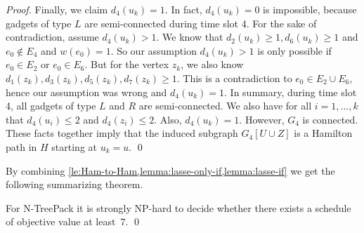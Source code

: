\documentclass[runningheads]{llncs}
\newcommand{\xxxNTP}{{\sc N-TreePack}}
\begin{document}
\begin{proof}
Finally, we claim $d_4(u_k) = 1$. In fact, $d_4(u_k) = 0$ is impossible, because gadgets of type $L$ are semi-connected during time slot 4. For the sake of contradiction, assume $d_4(u_k) > 1$. We know that $d_2(u_k) \geq 1, d_6(u_k) \geq 1$ and $e_0 \not\in E_4$ and $w(e_0) = 1$. So our assumption $d_4(u_k) > 1$ is only possible if $e_0 \in E_2$ or $e_0 \in E_6$. But for the vertex $z_k$, we also know $d_1(z_k), d_3(z_k), d_5(z_k), d_7(z_k) \geq 1$. This is a contradiction to $e_0 \in E_2 \cup E_6$, hence our assumption was wrong and $d_4(u_k) = 1$.
In summary, during time slot 4, all gadgets of type $L$ and $R$ are semi-connected. We also have for all $i=1,\dots,k$ that $d_4(u_i) \leq 2$ and $d_4(z_i) \leq 2$. Also, $d_4(u_k) = 1$. However, $G_4$ is connected. These facts together imply that the induced subgraph $G_4[U \cup Z]$ is a Hamilton path in $H$ starting at $u_k = u$.
\qed
\end{proof}

By combining \cref{le:Ham-to-Ham,lemma:lasse-only-if,lemma:lasse-if} we get
the following summarizing theorem.
\begin{theorem}
\label{th:value=7}
For {\xxxNTP} it is strongly NP-hard to decide whether there exists a schedule
of objective value at least~$7$.
\qed
\end{theorem}
\end{document}
